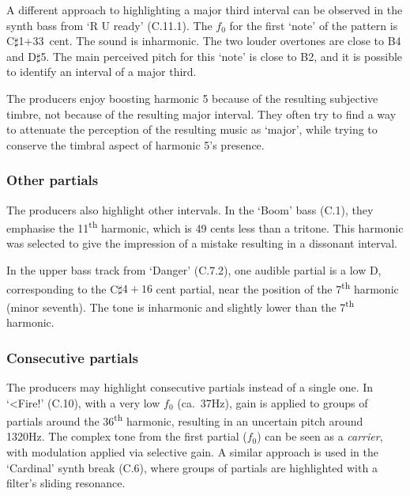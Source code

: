 \documentclass{article}
\begin{document}
A different approach to highlighting a major third interval can be observed in the synth bass from `R U ready' (C.11.1). The $f_0$ for the first `note' of the pattern is C$\sharp$1+33~cent. The sound is inharmonic. The two louder overtones are close to B4 and D$\sharp$5. The main perceived pitch for this `note' is close to B2, and it is possible to identify an interval of a major third.

The producers enjoy boosting harmonic 5 because of the resulting subjective timbre, not because of the resulting major interval. They often try to find a way to attenuate the perception of the resulting music as `major', while trying to conserve the timbral aspect of harmonic 5's presence.


\subsubsection{Other partials}

The producers also highlight other intervals. In the `Boom' bass (C.1), they emphasise the 11\textsuperscript{th} harmonic, which is 49 cents less than a tritone. This harmonic was selected to give the impression of a mistake resulting in a dissonant interval.


In the upper bass track from `Danger' (C.7.2), one audible partial is a low D, corresponding to the C$\sharp4+16$ cent partial, near the position of the 7\textsuperscript{th} harmonic (minor seventh). The tone is inharmonic and slightly lower than the 7\textsuperscript{th} harmonic.



\subsubsection{Consecutive partials}\label{sec:groupsofpartials}

The producers may highlight consecutive partials instead of a single one. In `<Fire!' (C.10), with a very low $f_0$ (ca.~37Hz), gain is applied to groups of partials around the 36\textsuperscript{th} harmonic, resulting in an uncertain pitch around 1320Hz. The complex tone from the first partial ($f_0$) can be seen as a \emph{carrier}, with modulation applied via selective gain. A similar approach is used in the `Cardinal' synth break (C.6), where groups of partials are highlighted with a filter's sliding resonance.
\end{document}
